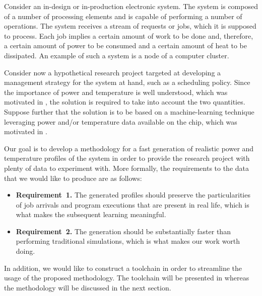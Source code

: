 Consider an in-design or in-production electronic system. The system is composed
of a number of processing elements and is capable of performing a number of
operations. The system receives a stream of requests or jobs, which it is
supposed to process. Each job implies a certain amount of work to be done and,
therefore, a certain amount of power to be consumed and a certain amount of heat
to be dissipated. An example of such a system is a node of a computer cluster.

Consider now a hypothetical research project targeted at developing a management
strategy for the system at hand, such as a scheduling policy. Since the
importance of power and temperature is well understood, which was motivated in
, the solution is required to take into account the two
quantities. Suppose further that the solution is to be based on a
machine-learning technique leveraging power and/or temperature data available on
the chip, which was motivated in .

Our goal is to develop a methodology for a fast generation of realistic power
and temperature profiles of the system in order to provide the research project
with plenty of data to experiment with. More formally, the requirements to the
data that we would like to produce are as follows:

\begin{itemize}
  \item {\bfseries Requirement~1.} The generated profiles should preserve the
  particularities of job arrivals and program executions that are present in
  real life, which is what makes the subsequent learning meaningful.

  \item {\bfseries Requirement~2.} The generation should be substantially faster
  than performing traditional simulations, which is what makes our work worth
  doing.
\end{itemize}

In addition, we would like to construct a toolchain in order to streamline the
usage of the proposed methodology. The toolchain will be presented in
 whereas the methodology will be discussed in the next section.
